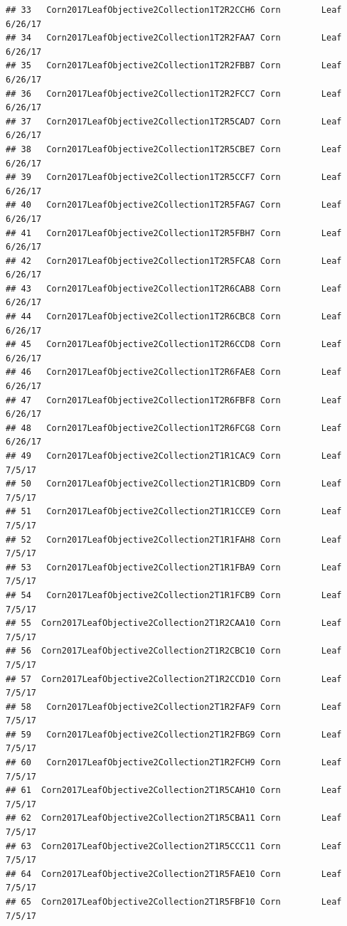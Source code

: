 \documentclass[
]{article}
\begin{document}
\begin{verbatim}
## 33   Corn2017LeafObjective2Collection1T2R2CCH6 Corn        Leaf     6/26/17
## 34   Corn2017LeafObjective2Collection1T2R2FAA7 Corn        Leaf     6/26/17
## 35   Corn2017LeafObjective2Collection1T2R2FBB7 Corn        Leaf     6/26/17
## 36   Corn2017LeafObjective2Collection1T2R2FCC7 Corn        Leaf     6/26/17
## 37   Corn2017LeafObjective2Collection1T2R5CAD7 Corn        Leaf     6/26/17
## 38   Corn2017LeafObjective2Collection1T2R5CBE7 Corn        Leaf     6/26/17
## 39   Corn2017LeafObjective2Collection1T2R5CCF7 Corn        Leaf     6/26/17
## 40   Corn2017LeafObjective2Collection1T2R5FAG7 Corn        Leaf     6/26/17
## 41   Corn2017LeafObjective2Collection1T2R5FBH7 Corn        Leaf     6/26/17
## 42   Corn2017LeafObjective2Collection1T2R5FCA8 Corn        Leaf     6/26/17
## 43   Corn2017LeafObjective2Collection1T2R6CAB8 Corn        Leaf     6/26/17
## 44   Corn2017LeafObjective2Collection1T2R6CBC8 Corn        Leaf     6/26/17
## 45   Corn2017LeafObjective2Collection1T2R6CCD8 Corn        Leaf     6/26/17
## 46   Corn2017LeafObjective2Collection1T2R6FAE8 Corn        Leaf     6/26/17
## 47   Corn2017LeafObjective2Collection1T2R6FBF8 Corn        Leaf     6/26/17
## 48   Corn2017LeafObjective2Collection1T2R6FCG8 Corn        Leaf     6/26/17
## 49   Corn2017LeafObjective2Collection2T1R1CAC9 Corn        Leaf      7/5/17
## 50   Corn2017LeafObjective2Collection2T1R1CBD9 Corn        Leaf      7/5/17
## 51   Corn2017LeafObjective2Collection2T1R1CCE9 Corn        Leaf      7/5/17
## 52   Corn2017LeafObjective2Collection2T1R1FAH8 Corn        Leaf      7/5/17
## 53   Corn2017LeafObjective2Collection2T1R1FBA9 Corn        Leaf      7/5/17
## 54   Corn2017LeafObjective2Collection2T1R1FCB9 Corn        Leaf      7/5/17
## 55  Corn2017LeafObjective2Collection2T1R2CAA10 Corn        Leaf      7/5/17
## 56  Corn2017LeafObjective2Collection2T1R2CBC10 Corn        Leaf      7/5/17
## 57  Corn2017LeafObjective2Collection2T1R2CCD10 Corn        Leaf      7/5/17
## 58   Corn2017LeafObjective2Collection2T1R2FAF9 Corn        Leaf      7/5/17
## 59   Corn2017LeafObjective2Collection2T1R2FBG9 Corn        Leaf      7/5/17
## 60   Corn2017LeafObjective2Collection2T1R2FCH9 Corn        Leaf      7/5/17
## 61  Corn2017LeafObjective2Collection2T1R5CAH10 Corn        Leaf      7/5/17
## 62  Corn2017LeafObjective2Collection2T1R5CBA11 Corn        Leaf      7/5/17
## 63  Corn2017LeafObjective2Collection2T1R5CCC11 Corn        Leaf      7/5/17
## 64  Corn2017LeafObjective2Collection2T1R5FAE10 Corn        Leaf      7/5/17
## 65  Corn2017LeafObjective2Collection2T1R5FBF10 Corn        Leaf      7/5/17

\end{verbatim}
\end{document}
